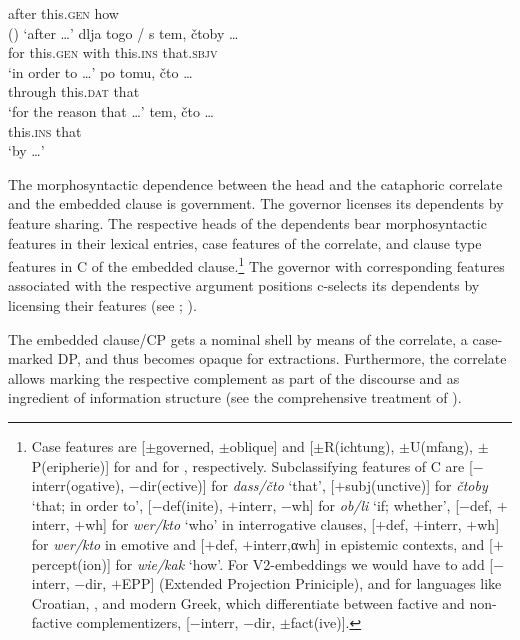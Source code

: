 \documentclass[output=paper]{langscibook}
\begin{document}
    after this.\textsc{gen} how {} \\ \hfill ()
    \glt `after {\dots}'
    \ex \gll dlja togo / s tem, čtoby {\dots} \\
    for this.\textsc{gen} {} with this.\textsc{ins} that.\textsc{sbjv} \\
    \glt `in order to {\dots}'
    \ex \gll po tomu, čto {\dots} \\
    through this.\textsc{dat} that {} \\
    \glt `for the reason that {\dots}'
    \ex \gll tem, čto {\dots} \\
    this.\textsc{ins} that {} \\
    \glt `by {\dots}'
\z\z\largerpage


\noindent The morphosyntactic dependence between the head and the cataphoric correlate and the embedded clause is government. The governor licenses its dependents by feature sharing. The respective heads of the dependents bear morphosyntactic features in their lexical entries, case features of the correlate, and clause type features in C of the embedded clause.\footnote{\label{fn:casefeatures}Case features are [$\pm$governed, $\pm$oblique] and [$\pm$R(ichtung), $\pm$U(mfang), $\pm$P(eripherie)] for  \citep[see][]{Bierwisch1967} and for  \citep[see][]{Jakobson1936,Jakobson1958}, respectively. Subclassifying features of C are [$-$interr(ogative), $-$dir(ective)] for \textit{dass/čto} `that', [$+$subj(unctive)] for \textit{čtoby} `that; in order to', [$-$def(inite), $+$interr, $-$wh] for \textit{ob/li} `if; whether', [$-$def, $+$interr, $+$wh] for \textit{wer/kto} `who' in interrogative clauses, [$+$def, $+$interr, $+$wh] for \textit{wer/kto} in emotive and [$+$def, $+$interr,αwh] in epistemic contexts, and [$+$percept(ion)] for \textit{wie/kak} `how'. For  V2-embeddings we would have to add [$-$interr, $-$dir, $+$EPP] (Extended Projection Priniciple), and for languages like Croatian, , and modern Greek, which differentiate between factive and non-factive complementizers, [$-$interr, $-$dir, $\pm$fact(ive)].}
The governor with corresponding features associated with the respective argument positions c-selects its dependents by licensing their features (see \citealt{Zimmermann1990,Zimmermann2013}; \citealt{Pitsch2014a,Pitsch2014b}).

The embedded clause/CP gets a nominal shell by means of the correlate, a case-marked DP, and thus becomes opaque for extractions. Furthermore, the correlate allows marking the respective complement as part of the discourse and as ingredient of information structure (see the comprehensive treatment of \citealt{Willer-Gold2013}).
\end{document}
